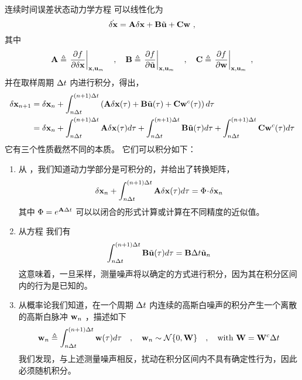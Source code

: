 \bigskip
连续时间误差状态动力学方程  可以线性化为
%
\begin{equation}
\dot{\delta{\bf x}} = {\bf A}\delta{\bf x} + {\bf B}\tilde{{\bf u}} + {\bf C} {\bf w}~, \label{equ:contTime}
\end{equation}
%
其中 
%
\begin{equation}
{\bf A}\triangleq\left.\frac{\partial f}{\partial\delta{\bf x}}\right|_{{\bf x},{\bf u}_m}\quad,\quad
{\bf B}\triangleq\left.\frac{\partial f}{\partial\tilde{{\bf u}}}\right|_{{\bf x},{\bf u}_m}\quad,\quad
{\bf C}\triangleq\left.\frac{\partial f}{\partial{\bf w}}\right|_{{\bf x},{\bf u}_m}~,
\end{equation}
%
并在取样周期 $\Delta t$ 内进行积分，得出，
%
\begin{align}
\delta{\bf x}_{n+1} &= \delta{\bf x}_n 
+ \int_{n\Delta t}^{(n+1)\Delta t} \left(
{\bf A}\delta{\bf x}(\tau) + {\bf B}\tilde{{\bf u}}(\tau) + {\bf C}{\bf w}^c(\tau)
\right) d\tau \\
 &= \delta{\bf x}_n 
+ \int_{n\Delta t}^{(n+1)\Delta t} {\bf A}\delta{\bf x}(\tau)   d\tau
+ \int_{n\Delta t}^{(n+1)\Delta t} {\bf B}\tilde{{\bf u}}(\tau)   d\tau 
+ \int_{n\Delta t}^{(n+1)\Delta t} {\bf C}{\bf w}^c(\tau) d\tau 
\end{align}
%
它有三个性质截然不同的本质。 
它们可以积分如下：
%
\begin{enumerate}
\item 从  ，我们知道动力学部分是可积分的，并给出了转换矩阵，
%
\begin{equation}
\delta{\bf x}_n 
+ \int_{n\Delta t}^{(n+1)\Delta t} {\bf A}\delta{\bf x}(\tau)   d\tau = \Phi\!\cdot\!\delta{\bf x}_n
\end{equation}
%
其中 $\Phi=e^{{\bf A}\Delta t}$ 可以以闭合的形式计算或计算在不同精度的近似值。

\item 从方程  我们有
%
\begin{equation}
\int_{n\Delta t}^{(n+1)\Delta t} {\bf B}\tilde{{\bf u}}(\tau)   d\tau = {\bf B}\Delta t\tilde{{\bf u}}_n
\end{equation}
%
这意味着，一旦采样，测量噪声将以确定的方式进行积分，因为其在积分区间内的行为是已知的。

\item 从概率论我们知道，在一个周期 $\Delta t$ 内连续的高斯白噪声的积分产生一个离散的高斯白脉冲 ${\bf w}_n$ ，描述如下
%
\begin{equation}
{\bf w}_n\triangleq\int_{n\Delta t}^{(n+1)\Delta t}{\bf w}(\tau)d\tau 
\quad,\quad
{\bf w}_n \sim \mathcal{N}\{0,{\bf W}\} 
\quad,\quad
 \text{with } {\bf W} = {\bf W}^c\Delta t
\end{equation}
%
我们发现，与上述测量噪声相反，扰动在积分区间内不具有确定性行为，因此必须随机积分。

\end{enumerate}%
